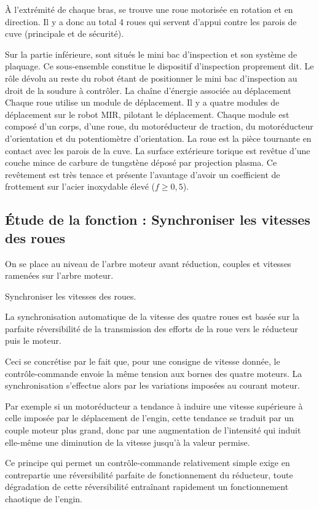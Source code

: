 \documentclass[10pt,fleqn]{article} %
\begin{document}
À l’extrémité de chaque bras, se trouve une roue motorisée en rotation et en direction. Il y a donc au total 4 roues qui servent d’appui contre les parois de cuve (principale et de sécurité).

Sur la partie inférieure, sont situés le mini bac d’inspection et son système de plaquage. Ce sous-ensemble constitue le dispositif d’inspection proprement dit. Le rôle dévolu au reste du robot étant de positionner le mini bac d’inspection au droit de la soudure à contrôler.
La chaîne d’énergie associée au déplacement
Chaque roue utilise un module de déplacement. Il y a quatre modules de déplacement sur le robot MIR, pilotant le déplacement.
Chaque module est composé d’un corps, d’une roue, du motoréducteur de traction, du motoréducteur d’orientation et du potentiomètre d’orientation.
La roue est la pièce tournante en contact avec les parois de la cuve. La surface extérieure torique est revêtue d’une couche mince de carbure de tungstène déposé par projection plasma. Ce revêtement est très tenace et présente l’avantage d’avoir un coefficient de frottement sur l’acier inoxydable élevé ($f \geq 0,5$).


\subsection{Étude de la fonction : Synchroniser les vitesses des roues}

On se place au niveau de l’arbre moteur avant réduction, couples et vitesses ramenées sur l’arbre moteur.

\begin{obj}
Synchroniser les vitesses des roues.
\end{obj}
La synchronisation automatique de la vitesse des quatre roues est basée sur la parfaite réversibilité de la transmission des efforts de la roue vers le réducteur puis le moteur. 

Ceci se concrétise par le fait que, pour une consigne de vitesse donnée, le contrôle-commande envoie la même tension aux bornes des quatre moteurs. La synchronisation s'effectue alors par les variations imposées au courant moteur. 

Par exemple si un motoréducteur a tendance à induire une vitesse supérieure à celle imposée par le déplacement de l'engin, cette tendance se traduit par un couple moteur plus grand, donc par une augmentation de l'intensité qui induit elle-même une diminution de la vitesse jusqu'à la valeur permise.

Ce principe qui permet un contrôle-commande relativement simple exige en contrepartie une réversibilité parfaite de fonctionnement du réducteur, toute dégradation de cette réversibilité entraînant rapidement un fonctionnement chaotique de l'engin.
\end{document}
